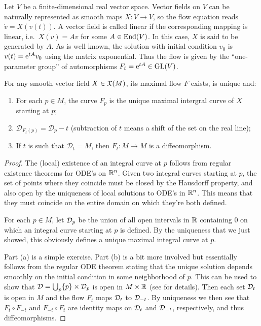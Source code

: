 \begin{example}
    Let $V$ be a finite-dimensional real vector space.  Vector fields on $V$ can be naturally represented as smooth maps $X:V\to V$, so the flow equation reads $\dot v=X(v(t))$. A vector field is called linear if the corresponding mapping is linear, i.e.~$X(v)=Av$ for some $A\in\operatorname{End}(V)$. In this case, $X$ is said to be generated by $A$. As is well known, the solution with initial condition $v_0$ is $v(t)=\mathrm{e}^{tA}v_0$ using the matrix exponential. Thus the flow is given by the ``one-parameter group'' of automorphisms $F_t=\mathrm{e}^{tA}\in \operatorname{GL}(V)$.
\end{example}

\begin{thm}\label{thm fundamental of flows}
    For any smooth vector field $X\in\mathfrak{X}(M)$, its maximal flow $F$ exists, is unique and:
    \begin{enumerate}
        \item For each $p\in M$, the curve $F_p$ is the unique maximal intergral curve of $X$ starting at $p$;
        \item $\mathcal{D}_{F_t(p)}=\mathcal{D}_p-t$ (subtraction of $t$ means a shift of the set on the real line);
        \item If $t$ is such that $\mathcal{D}_t=M$, then $F_t:M\to M$ is a diffeomorphism.
    \end{enumerate}
\end{thm}
\begin{proof}
The (local) existence of an integral curve at $p$ follows from regular existence theorems for ODE's on $\mathbb{R}^n$. Given two integral curves starting at $p$, the set of points where they coincide must be closed by the Hausdorff property, and also open by the uniqueness of local solutions to ODE's in $\mathbb{R}^n$. This means that they must coincide on the entire domain on which they're both defined.

For each $p\in M$, let $\mathcal{D}_p$ be the union of all open intervals in $\mathbb{R}$ containing $0$ on which an integral curve starting at $p$ is defined. By the uniqueness that we just showed, this obviously defines a unique maximal integral curve at $p$.

Part (a) is a simple exercise. Part (b) is a bit more involved but essentially follows from the regular ODE theorem stating that the unique solution depends smoothly on the initial condition in some neighborhood of $p$. This can be used to show that $\mathcal{D}=\bigcup_p \{p\}\times \mathcal{D}_p$ is open in $M\times\mathbb{R}$ (see \cite[Thm.~9.12]{Lee} for details). Then each set $\mathcal{D}_t$ is open in $M$ and the flow $F_t$ maps $\mathcal{D}_t$ to $\mathcal{D}_{-t}$. By uniqueness we then see that $F_t\circ F_{-t}$ and $F_{-t}\circ F_t$ are identity maps on $\mathcal{D}_t$ and $\mathcal{D}_{-t}$, respectively, and thus diffeomorphisms.
\end{proof}



